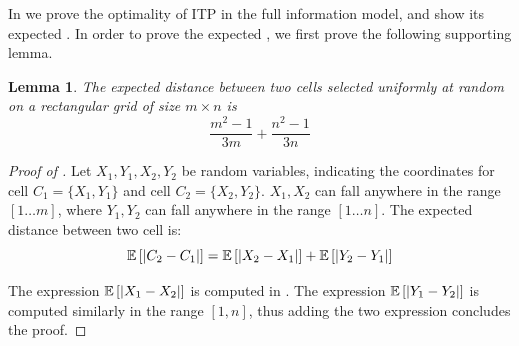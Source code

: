 \documentclass[a4paper,11pt]{article}
\newtheorem{lemma}[theorem]{Lemma}
\theoremstyle{definition}
\newcommand{\fcc}{{{\sf{FCC}}}\xspace}
\newcommand{\itp}{{{\textsf{ITP}}}\xspace}
\DeclarePairedDelimiter\abs{\lvert}{\rvert}%
\begin{document}
In  we prove the optimality of \itp in the full information model, and show its expected \fcc. %
In order to prove the expected \fcc, we first prove the following supporting lemma.
\begin{lemma}\label{lemmas:ExpectedDistanceTwoCellsRectangular}
The expected distance between two cells selected uniformly at random on a rectangular grid of size $m\times n$ is \[ \frac{m^2-1}{3m}+\frac{n^2-1}{3n}\]
\end{lemma}
\begin{proof}[Proof of ]
Let $X_1,Y_1,X_2,Y_2$ be random variables, indicating the coordinates for cell $C_1=\lbrace X_1, Y_1 \rbrace$ and  cell $C_2=\lbrace X_2, Y_2 \rbrace$. $X_1,X_2$ can fall anywhere in the range $\left[1\ldots m\right]$, where $Y_1,Y_2$ can fall anywhere in the range $\left[1\ldots n\right]$.
The expected distance between two cell is:
\[\mathbb{E}\left[\abs*{C_2-C_1}\right]=\mathbb{E}\left[\abs*{X_2-X_1}\right]+\mathbb{E}\left[\abs*{Y_2-Y_1}\right]\]

The expression $\mathbb{E}\left[\abs*{X_1-X_2}\right]$ is computed in . 
The expression $\mathbb{E}\left[\abs*{Y_1-Y_2}\right]$ is computed similarly in the range $[1,n]$, thus adding the two expression concludes the proof.


\end{proof}
\end{document}
